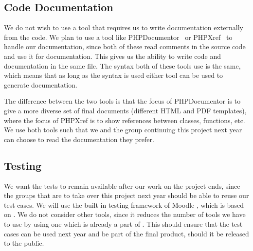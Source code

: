 \subsection{Code Documentation}
We do not wish to use a tool that requires us to write documentation externally from the code.
We plan to use a tool like PHPDocumentor~\cite{phpdocumentor} or PHPXref~\cite{phpxref} to handle our documentation, since both of these read comments in the source code and use it for documentation.
This gives us the ability to write code and documentation in the same file.
The syntax both of these tools use is the same, which means that as long as the syntax is used either tool can be used to generate documentation.

The difference between the two tools is that the focus of PHPDocumentor is to give a more diverse set of final documents (different HTML and PDF templates), where the focus of PHPXref is to show references between classes, functions, etc.
We use both tools such that we and the group continuing this project next year can choose to read the documentation they prefer.


\subsection{Testing}
\label{sub:testing}
We want the tests to remain available after our work on the project ends, since the groups that are to take over this project next year should be able to reuse our test cases.
We will use the built-in testing framework of Moodle \cite{moodletest}, which is based on \simpletest{} \cite{simpletest}.
We do not consider other tools, since it reduces the number of tools we have to use by using one which is already a part of \moodle{}.
This should ensure that the test cases can be used next year and be part of the final product, should it be released to the public.